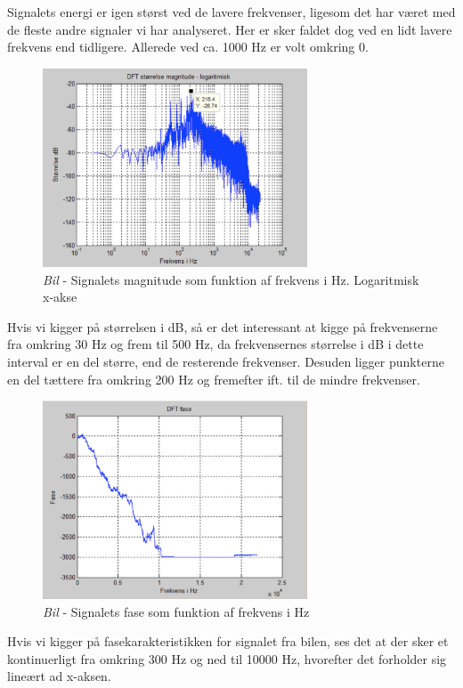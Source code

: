 Signalets energi er igen størst ved de lavere frekvenser, ligesom det har været med de fleste andre signaler vi har analyseret. Her er sker faldet dog ved en lidt lavere frekvens end tidligere. Allerede ved ca. 1000 Hz er volt omkring 0.

\begin{figure}[H]
	\centering
	\includegraphics[width=0.7\textwidth]{Figurer/Bil3}
	\caption{\textit{Bil} - Signalets magnitude som funktion af frekvens i Hz. Logaritmisk x-akse}
\end{figure}

Hvis vi kigger på størrelsen i dB, så er det interessant at kigge på frekvenserne fra omkring 30 Hz og frem til 500 Hz, da frekvensernes størrelse i dB i dette interval er en del større, end de resterende frekvenser. Desuden ligger punkterne en del tættere fra omkring 200 Hz og fremefter ift. til de mindre frekvenser.

\begin{figure}[H]
	\centering
	\includegraphics[width=0.7\textwidth]{Figurer/Bil4}
	\caption{\textit{Bil} - Signalets fase som funktion af frekvens i Hz}
\end{figure}

Hvis vi kigger på fasekarakteristikken for signalet fra bilen, ses det at der sker et kontinuerligt fra omkring 300 Hz og ned til 10000 Hz, hvorefter det forholder sig lineært ad x-aksen.









